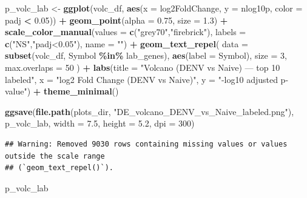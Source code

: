 \documentclass[
]{article}
\newenvironment{Shaded}{\begin{snugshade}}{\end{snugshade}}
\newcommand{\AttributeTok}[1]{\textcolor[rgb]{0.13,0.29,0.53}{#1}}
\newcommand{\DecValTok}[1]{\textcolor[rgb]{0.00,0.00,0.81}{#1}}
\newcommand{\FloatTok}[1]{\textcolor[rgb]{0.00,0.00,0.81}{#1}}
\newcommand{\FunctionTok}[1]{\textcolor[rgb]{0.13,0.29,0.53}{\textbf{#1}}}
\newcommand{\NormalTok}[1]{#1}
\newcommand{\OtherTok}[1]{\textcolor[rgb]{0.56,0.35,0.01}{#1}}
\newcommand{\SpecialCharTok}[1]{\textcolor[rgb]{0.81,0.36,0.00}{\textbf{#1}}}
\newcommand{\StringTok}[1]{\textcolor[rgb]{0.31,0.60,0.02}{#1}}
\begin{document}
\begin{Shaded}
\begin{Highlighting}[]
\NormalTok{p\_volc\_lab }\OtherTok{\textless{}{-}} \FunctionTok{ggplot}\NormalTok{(volc\_df, }\FunctionTok{aes}\NormalTok{(}\AttributeTok{x =}\NormalTok{ log2FoldChange, }\AttributeTok{y =}\NormalTok{ nlog10p, }\AttributeTok{color =}\NormalTok{ padj }\SpecialCharTok{\textless{}} \FloatTok{0.05}\NormalTok{)) }\SpecialCharTok{+}
  \FunctionTok{geom\_point}\NormalTok{(}\AttributeTok{alpha =} \FloatTok{0.75}\NormalTok{, }\AttributeTok{size =} \FloatTok{1.3}\NormalTok{) }\SpecialCharTok{+}
  \FunctionTok{scale\_color\_manual}\NormalTok{(}\AttributeTok{values =} \FunctionTok{c}\NormalTok{(}\StringTok{"grey70"}\NormalTok{,}\StringTok{"firebrick"}\NormalTok{), }\AttributeTok{labels =} \FunctionTok{c}\NormalTok{(}\StringTok{"NS"}\NormalTok{,}\StringTok{"padj\textless{}0.05"}\NormalTok{), }\AttributeTok{name =} \StringTok{""}\NormalTok{) }\SpecialCharTok{+}
  \FunctionTok{geom\_text\_repel}\NormalTok{(}
    \AttributeTok{data =} \FunctionTok{subset}\NormalTok{(volc\_df, Symbol }\SpecialCharTok{\%in\%}\NormalTok{ lab\_genes),}
    \FunctionTok{aes}\NormalTok{(}\AttributeTok{label =}\NormalTok{ Symbol), }\AttributeTok{size =} \DecValTok{3}\NormalTok{, }\AttributeTok{max.overlaps =} \DecValTok{50}
\NormalTok{  ) }\SpecialCharTok{+}
  \FunctionTok{labs}\NormalTok{(}\AttributeTok{title =} \StringTok{"Volcano (DENV vs Naive) — top 10 labeled"}\NormalTok{,}
       \AttributeTok{x =} \StringTok{"log2 Fold Change (DENV vs Naive)"}\NormalTok{, }\AttributeTok{y =} \StringTok{"{-}log10 adjusted p{-}value"}\NormalTok{) }\SpecialCharTok{+}
  \FunctionTok{theme\_minimal}\NormalTok{()}

\FunctionTok{ggsave}\NormalTok{(}\FunctionTok{file.path}\NormalTok{(plots\_dir, }\StringTok{"DE\_volcano\_DENV\_vs\_Naive\_labeled.png"}\NormalTok{),}
\NormalTok{       p\_volc\_lab, }\AttributeTok{width =} \FloatTok{7.5}\NormalTok{, }\AttributeTok{height =} \FloatTok{5.2}\NormalTok{, }\AttributeTok{dpi =} \DecValTok{300}\NormalTok{)}
\end{Highlighting}
\end{Shaded}

\begin{verbatim}
## Warning: Removed 9030 rows containing missing values or values outside the scale range
## (`geom_text_repel()`).
\end{verbatim}

\begin{Shaded}
\begin{Highlighting}[]
\NormalTok{p\_volc\_lab}
\end{Highlighting}
\end{Shaded}
\end{document}
